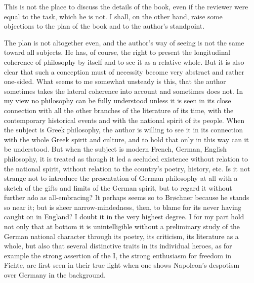\documentclass[12pt,a4paper,openany]{book}
\begin{document}
This is not the place to discuss the details of the book, even
if the reviewer were equal to the task, which he is not. I shall,
on the other hand, raise some objections to the plan of the book
and to the author's standpoint.

The plan is not altogether even, and the author's way of seeing
is not the same toward all subjects. He has, of course, the right
to present the longitudinal coherence of philosophy by itself and
to see it as a relative whole. But it is also clear that such a
conception must of necessity become very abstract and rather
one-sided. What seems to me somewhat unsteady is this, that the
author sometimes takes the lateral coherence into account and
sometimes does not. In my view no philosophy can be fully
understood unless it is seen in its close connection with all the
other branches of the literature of its time, with the
contemporary historical events
and with the national spirit of its people. When the subject is
Greek philosophy, the author is willing to see it in its
connection with the whole Greek spirit and culture, and to hold
that only in this way can it be understood. But when the subject
is modern French, German, English philosophy, it is treated as
though it led a secluded existence without relation to the
national spirit, without relation to the country's poetry,
history, etc. Is it not strange not to introduce the presentation
of German philosophy at all with a sketch of the gifts and limits
of the German spirit, but to regard it without further ado as
all-embracing? It perhaps seems so to Brøchner because he stands
so near it; but is sheer narrow-mindedness, then, to blame for its
never having caught on in England? I doubt it in the very highest
degree. I for my part hold not only that at bottom it is
unintelligible without a preliminary study of the German national
character through its poetry, its criticism, its literature as a
whole, but also that several distinctive traits in its individual
heroes, as for example the strong assertion of the I, the strong
enthusiasm for freedom in Fichte, are first seen in their true
light when one shows Napoleon's despotism over Germany in the
background.
\end{document}
